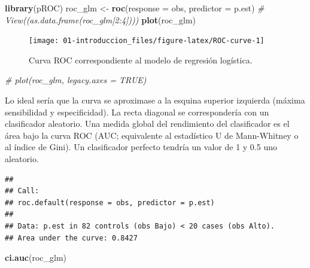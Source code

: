 \documentclass[]{book}
\newenvironment{Shaded}{\begin{snugshade}}{\end{snugshade}}
\newcommand{\KeywordTok}[1]{\textcolor[rgb]{0.13,0.29,0.53}{\textbf{#1}}}
\newcommand{\DataTypeTok}[1]{\textcolor[rgb]{0.13,0.29,0.53}{#1}}
\newcommand{\StringTok}[1]{\textcolor[rgb]{0.31,0.60,0.02}{#1}}
\newcommand{\CommentTok}[1]{\textcolor[rgb]{0.56,0.35,0.01}{\textit{#1}}}
\newcommand{\NormalTok}[1]{#1}
\theoremstyle{break}
\theoremstyle{definition}
\theoremstyle{definition}
\theoremstyle{definition}
\theoremstyle{remark}
\begin{document}
\begin{Shaded}
\begin{Highlighting}[]
\KeywordTok{library}\NormalTok{(pROC)}
\NormalTok{roc_glm <-}\StringTok{ }\KeywordTok{roc}\NormalTok{(}\DataTypeTok{response =}\NormalTok{ obs, }\DataTypeTok{predictor =}\NormalTok{ p.est)}
\CommentTok{# View((as.data.frame(roc_glm[2:4])))}
\KeywordTok{plot}\NormalTok{(roc_glm)}
\end{Highlighting}
\end{Shaded}

\begin{figure}[!htb]

{\centering \texttt{[image: 01-introduccion\_files/figure-latex/ROC-curve-1]} 

}

\caption{Curva ROC correspondiente al modelo de regresión logística.}\label{fig:ROC-curve}
\end{figure}

\begin{Shaded}
\begin{Highlighting}[]
\CommentTok{# plot(roc_glm, legacy.axes = TRUE)}
\end{Highlighting}
\end{Shaded}

Lo ideal sería que la curva se aproximase a la esquina superior
izquierda (máxima sensibilidad y especificidad). La recta diagonal se
correspondería con un clasificador aleatorio. Una medida global del
rendimiento del clasificador es el área bajo la curva ROC (AUC;
equivalente al estadístico U de Mann-Whitney o al índice de Gini). Un
clasificador perfecto tendría un valor de 1 y 0.5 uno aleatorio.

\begin{Shaded}
\end{Shaded}

\begin{verbatim}
## 
## Call:
## roc.default(response = obs, predictor = p.est)
## 
## Data: p.est in 82 controls (obs Bajo) < 20 cases (obs Alto).
## Area under the curve: 0.8427
\end{verbatim}

\begin{Shaded}
\begin{Highlighting}[]
\KeywordTok{ci.auc}\NormalTok{(roc_glm)}
\end{Highlighting}
\end{Shaded}
\end{document}
